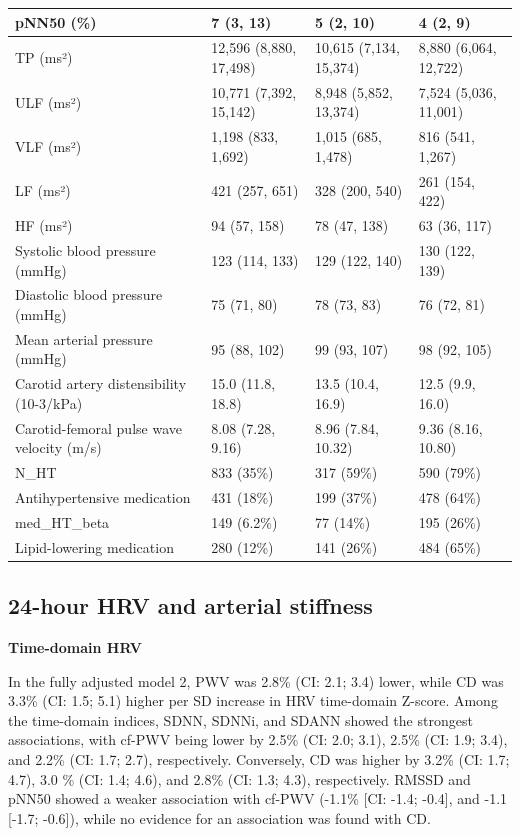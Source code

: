 \documentclass[
  a4paper,
  headsepline=true,
  open=any]{scrbook}
\begin{document}
\begin{table}
{\begin{tabular}{l|l|l|l}
\hline
pNN50 (\%) & 7 (3, 13) & 5 (2, 10) & 4 (2, 9)\\
\hline
TP (ms²) & 12,596 (8,880, 17,498) & 10,615 (7,134, 15,374) & 8,880 (6,064, 12,722)\\
\hline
ULF (ms²) & 10,771 (7,392, 15,142) & 8,948 (5,852, 13,374) & 7,524 (5,036, 11,001)\\
\hline
VLF (ms²) & 1,198 (833, 1,692) & 1,015 (685, 1,478) & 816 (541, 1,267)\\
\hline
LF (ms²) & 421 (257, 651) & 328 (200, 540) & 261 (154, 422)\\
\hline
HF (ms²) & 94 (57, 158) & 78 (47, 138) & 63 (36, 117)\\
\hline
Systolic blood pressure (mmHg) & 123 (114, 133) & 129 (122, 140) & 130 (122, 139)\\
\hline
Diastolic blood pressure (mmHg) & 75 (71, 80) & 78 (73, 83) & 76 (72, 81)\\
\hline
Mean arterial pressure (mmHg) & 95 (88, 102) & 99 (93, 107) & 98 (92, 105)\\
\hline
Carotid artery distensibility (10-3/kPa) & 15.0 (11.8, 18.8) & 13.5 (10.4, 16.9) & 12.5 (9.9, 16.0)\\
\hline
Carotid-femoral pulse wave velocity (m/s) & 8.08 (7.28, 9.16) & 8.96 (7.84, 10.32) & 9.36 (8.16, 10.80)\\
\hline
N\_HT & 833 (35\%) & 317 (59\%) & 590 (79\%)\\
\hline
Antihypertensive medication & 431 (18\%) & 199 (37\%) & 478 (64\%)\\
\hline
med\_HT\_beta & 149 (6.2\%) & 77 (14\%) & 195 (26\%)\\
\hline
Lipid-lowering medication & 280 (12\%) & 141 (26\%) & 484 (65\%)\\
\hline
\end{tabular}}
\end{table}

\hypertarget{hour-hrv-and-arterial-stiffness}{%
\subsection{24-hour HRV and arterial
stiffness}\label{hour-hrv-and-arterial-stiffness}}

\textbf{Time-domain HRV}

In the fully adjusted model 2, PWV was 2.8\% (CI: 2.1; 3.4) lower, while
CD was 3.3\% (CI: 1.5; 5.1) higher per SD increase in HRV time-domain
Z-score. Among the time-domain indices, SDNN, SDNNi, and SDANN showed
the strongest associations, with cf-PWV being lower by 2.5\% (CI: 2.0;
3.1), 2.5\% (CI: 1.9; 3.4), and 2.2\% (CI: 1.7; 2.7), respectively.
Conversely, CD was higher by 3.2\% (CI: 1.7; 4.7), 3.0 \% (CI: 1.4;
4.6), and 2.8\% (CI: 1.3; 4.3), respectively. RMSSD and pNN50 showed a
weaker association with cf-PWV (-1.1\% {[}CI: -1.4; -0.4{]}, and -1.1
{[}-1.7; -0.6{]}), while no evidence for an association was found with
CD.
\end{document}
